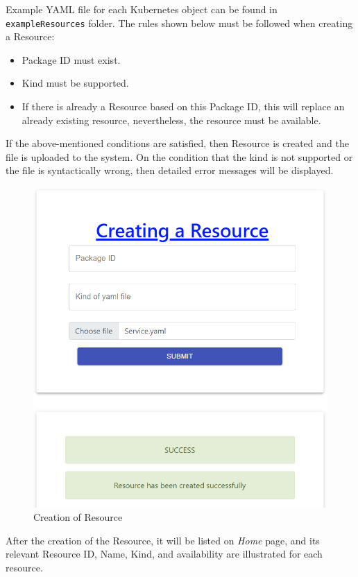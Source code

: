 Example YAML file for each Kubernetes object can be found in \texttt{exampleResources} folder. The rules shown below must be followed when creating a Resource:
\begin{itemize}
  \item Package ID must exist.
  \item Kind must be supported.
  \item If there is already a Resource based on this Package ID, this will replace an already existing resource, nevertheless, the resource must be available.
\end{itemize}

If the above-mentioned conditions are satisfied, then Resource is created and the file is uploaded to the system. On the condition that the kind is not supported or the file is syntactically wrong, then detailed error messages will be displayed.

\begin{figure}[H]
	\centering
	\includegraphics[width=120mm]{images/creation-resource-2.png}
	\caption{Creation of Resource}
	\label{ssec:creation-of-resource}
\end{figure}

After the creation of the Resource, it will be listed on \emph{Home} page, and its relevant Resource ID, Name, Kind, and availability are illustrated for each resource. 

